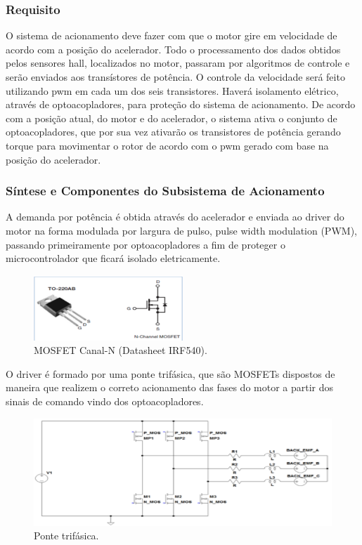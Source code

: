 		\subsubsection{Requisito}
		O sistema de acionamento deve fazer com que o motor gire em velocidade de acordo com a posição do acelerador. Todo o processamento dos dados obtidos pelos sensores hall, localizados no motor, passaram por algoritmos de controle e serão enviados aos transístores de potência. O controle da velocidade será feito utilizando pwm em cada um dos seis transistores. Haverá isolamento elétrico, através de optoacopladores, para proteção do sistema de acionamento.
		De acordo com a posição atual, do motor e do acelerador, o sistema ativa o conjunto de optoacopladores, que por sua vez ativarão os transistores de potência gerando torque para movimentar o rotor de acordo com o pwm gerado com base na posição do acelerador.
	
	
		\subsubsection{Síntese e Componentes do Subsistema de Acionamento}
		A demanda por potência é obtida através do acelerador e enviada ao driver do motor na forma modulada por largura de pulso, pulse width modulation (PWM), passando primeiramente por optoacopladores a fim de proteger o microcontrolador que ficará isolado eletricamente.
		
			\graphicspath{{figuras/}}
			\begin{figure}[h!]
				\centering
				\includegraphics[width=0.5\textwidth]{Figura_3_MOSFET.PNG}
				\caption{MOSFET Canal-N (Datasheet IRF540).}
				\label{img:MOSFET}
			\end{figure}
		
		O driver é formado por uma ponte trifásica, que são MOSFETs dispostos de maneira que realizem o correto acionamento das fases do motor a partir dos sinais de comando vindo dos optoacopladores.
		
			\graphicspath{{figuras/}}
			\begin{figure}[h!]
				\centering
				\includegraphics[scale=1.2]{Figura4_Ponte_Trifasica.PNG}
				\caption{Ponte trifásica.}
				\label{img:Ponte_Trifasica}
			\end{figure}
		
